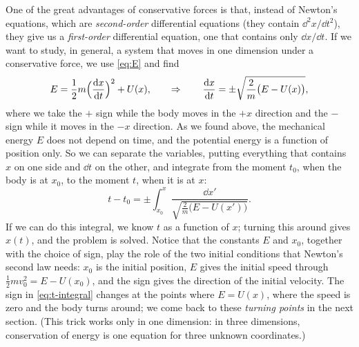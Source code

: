 \documentclass[11pt,a4paper]{article}
\begin{document}
One of the great advantages of conservative forces is that, instead of Newton's equations, which
are \emph{second-order} differential equations (they contain $\dd^2 x/\dd t^2$), they give us a
\emph{first-order} differential equation, one that contains only $\dd x/\dd t$. If we want to study,
in general, a system that moves in one dimension under a conservative force, we use
\eqref{eq:E} and find
\begin{equation}\label{eq:dxdt}
  E = \frac12 m\Bigl(\frac{\mathrm{d} x}{\mathrm{d} t}\Bigr)^2 + U(x) , \qquad\Rightarrow\qquad
  \frac{\mathrm{d} x}{\mathrm{d} t} = \pm\sqrt{\frac{2}{m}\bigl(E - U(x)\bigr)} ,
\end{equation}
where we take the $+$ sign while the body moves in the $+x$ direction and the $-$ sign while it moves
in the $-x$ direction. As we found above, the mechanical energy $E$ does not depend on time, and the
potential energy is a function of position only. So we can separate the variables, putting
everything that contains $x$ on one side and $\dd t$ on the other, and integrate from the moment
$t_0$, when the body is at $x_0$, to the moment $t$, when it is at $x$:
\begin{equation}\label{eq:t-integral}
  t - t_0 = \pm\int_{x_0}^{x} \frac{\dd x'}{\sqrt{\frac{2}{m}\bigl(E - U(x')\bigr)}} .
\end{equation}
If we can do this integral, we know $t$ as a function of $x$; turning this around gives $x(t)$, and
the problem is solved. Notice that the constants $E$ and $x_0$, together with the choice of sign,
play the role of the two initial conditions that Newton's second law needs: $x_0$ is the initial
position, $E$ gives the initial speed through $\frac12 mv_0^2 = E - U(x_0)$, and the sign gives the
direction of the initial velocity. The sign in
\eqref{eq:t-integral} changes at the points where $E = U(x)$, where the speed is zero and the body
turns around; we come back to these \emph{turning points} in the next section. (This trick works
only in one dimension: in three dimensions, conservation of energy is one equation for three
unknown coordinates.)
\end{document}
